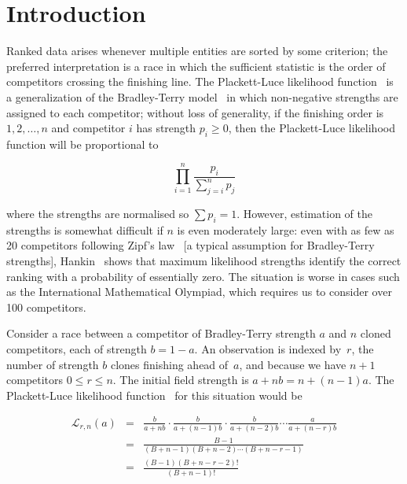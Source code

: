 \documentclass[ejs]{imsart}
\theoremstyle{plain}
\theoremstyle{definition}
\theoremstyle{remark}
\begin{document}
\section{Introduction}

Ranked data arises whenever multiple entities are sorted by some
criterion; the preferred interpretation is a race in which the
sufficient statistic is the order of competitors crossing the
finishing line.  The Plackett-Luce likelihood
function~\cite{luce1959,plackett1975} is a generalization of the
Bradley-Terry model~\cite{bradley1952} in which non-negative strengths
are assigned to each competitor; without loss of generality, if the
finishing order is $1,2,\ldots,n$ and competitor $i$ has strength
$p_i\geqslant 0$, then the Plackett-Luce likelihood function will be
proportional to

\begin{equation}\label{plackettluce}
\prod_{i=1}^n\frac{p_i}{\sum_{j=i}^np_j}
\end{equation}

\noindent where the strengths are normalised so $\sum p_i=1$.
However, estimation of the strengths is somewhat difficult if $n$ is
even moderately large: even with as few as 20 competitors following
Zipf's law~\cite{zipf1949} [a typical assumption for Bradley-Terry
  strengths], Hankin~\cite{hankin2017_rmd} shows that maximum
likelihood strengths identify the correct ranking with a probability
of essentially zero.  The situation is worse in cases such as the
International Mathematical Olympiad, which requires us to consider
over 100 competitors.

Consider a race between a competitor of Bradley-Terry strength $a$ and
$n$ cloned competitors, each of strength $b=1-a$.  An observation is
indexed by~$r$, the number of strength $b$ clones finishing ahead
of~$a$, and because we have $n+1$ competitors $0\leqslant r\leqslant
n$.  The initial field strength is $a+nb=n+(n-1)a$.  The Plackett-Luce
likelihood function~\cite{plackett1975,luce1959} for this situation
would be

\begin{eqnarray}\label{likeforrn1}
  \mathcal{L}_{r,n}(a) &=& 
\frac{b}{a+ n   b}\cdot
\frac{b}{a+(n-1)b}\cdot
\frac{b}{a+(n-2)b}\cdots
\frac{a}{a+(n-r)b}\\ \label{likeforrn2}
&=& \frac{B-1}{(B+n-1)(B+n-2)\cdots(B+n-r-1)}\\ \label{likeforrn3}
&=& \frac{(B-1)(B+n-r-2)!}{(B+n-1)!}
\end{eqnarray}
\end{document}
